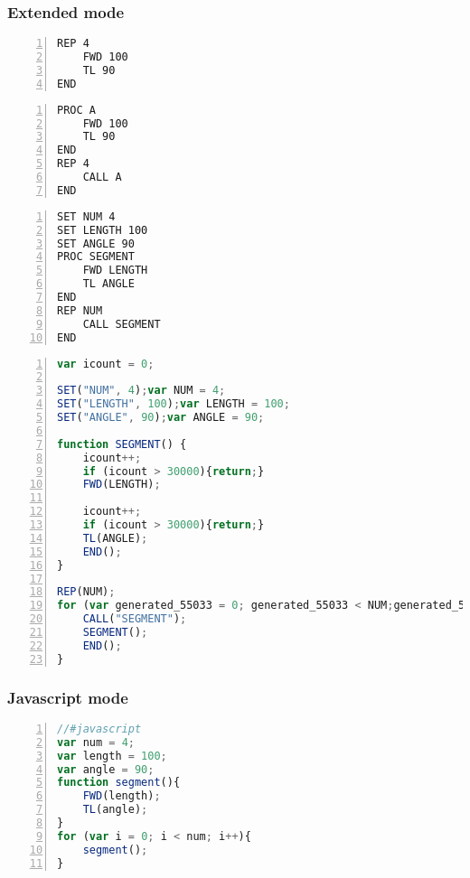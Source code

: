 \documentclass[12pt]{exam}
\begin{document}
	\subsubsection{Extended mode}
		\begin{minipage}{\linewidth}
			\begin{lstlisting}[frame=single,numbers=left,caption=Extended mode using loops.,language=MyBasic]
REP 4
	FWD 100
	TL 90
END
			\end{lstlisting}
		\end{minipage}
		\begin{minipage}{\linewidth}
			\begin{lstlisting}[frame=single,numbers=left,caption=Extended mode using procedures and loops.,language=MyBasic]
PROC A
	FWD 100
	TL 90
END
REP 4
	CALL A
END
			\end{lstlisting}
		\end{minipage}
		\begin{minipage}{\linewidth}
			\begin{lstlisting}[frame=single,numbers=left,caption=Extended mode using procedures loops and variables.,language=MyBasic]
SET NUM 4
SET LENGTH 100
SET ANGLE 90
PROC SEGMENT
    FWD LENGTH
    TL ANGLE
END 
REP NUM
    CALL SEGMENT
END 
			\end{lstlisting}
		\end{minipage}
		\begin{minipage}{\linewidth}
			\begin{lstlisting}[frame=single,numbers=left,caption=The internal representation of the previous program.,language=Javascript]
var icount = 0; 

SET("NUM", 4);var NUM = 4; 
SET("LENGTH", 100);var LENGTH = 100; 
SET("ANGLE", 90);var ANGLE = 90; 

function SEGMENT() { 
	icount++; 
	if (icount > 30000){return;} 
	FWD(LENGTH); 

	icount++; 
	if (icount > 30000){return;} 
	TL(ANGLE); 
	END();
} 

REP(NUM);
for (var generated_55033 = 0; generated_55033 < NUM;generated_55033++) { 
	CALL("SEGMENT");
	SEGMENT(); 
	END();
}
			\end{lstlisting}
		\end{minipage}
	\subsubsection{Javascript mode}
		\begin{minipage}{\linewidth}
			\begin{lstlisting}[frame=single,numbers=left,caption=Javascript mode,language=JavaScript]
//#javascript
var num = 4;
var length = 100;
var angle = 90;
function segment(){
	FWD(length);
	TL(angle);
}
for (var i = 0; i < num; i++){
	segment();
}		
			\end{lstlisting}
		\end{minipage}
\end{document}
